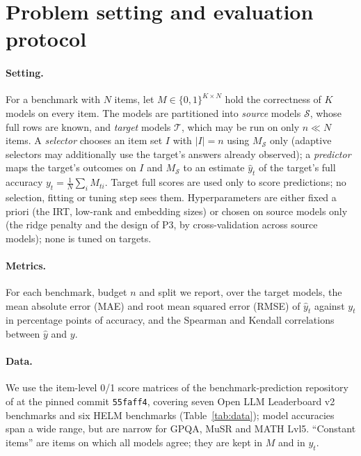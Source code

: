 \section{Problem setting and evaluation protocol}
\label{sec:setup}

\paragraph{Setting.}
For a benchmark with $N$ items, let $M\in\{0,1\}^{K\times N}$ hold the correctness of $K$ models on every item. The models are partitioned into \emph{source} models $\mathcal S$, whose full rows are known, and \emph{target} models $\mathcal T$, which may be run on only $n\ll N$ items. A \emph{selector} chooses an item set $I$ with $|I|=n$ using $M_{\mathcal S}$ only (adaptive selectors may additionally use the target's answers already observed); a \emph{predictor} maps the target's outcomes on $I$ and $M_{\mathcal S}$ to an estimate $\hat y_t$ of the target's full accuracy $y_t=\frac1N\sum_i M_{ti}$. Target full scores are used only to score predictions; no selection, fitting or tuning step sees them. Hyperparameters are either fixed a priori (the IRT, low-rank and embedding sizes) or chosen on source models only (the ridge penalty and the design of P3, by cross-validation across source models); none is tuned on targets.

\paragraph{Metrics.}
For each benchmark, budget $n$ and split we report, over the target models, the mean absolute error (MAE) and root mean squared error (RMSE) of $\hat y_t$ against $y_t$ in percentage points of accuracy, and the Spearman and Kendall correlations between $\hat y$ and $y$.

\paragraph{Data.}
We use the item-level 0/1 score matrices of the benchmark-prediction repository of \citet{zhang2025benchmark} at the pinned commit \texttt{55faff4}, covering seven Open LLM Leaderboard v2 benchmarks and six HELM benchmarks (Table~\ref{tab:data}); model accuracies span a wide range, but are narrow for GPQA, MuSR and MATH Lvl5. ``Constant items'' are items on which all models agree; they are kept in $M$ and in $y_t$.

\begin{table}[t]
\caption{Score matrices used (model accuracies in \%). Generated by \texttt{figures/make\_data\_table.py}.}
\label{tab:data}
\centering\small

\end{table}
